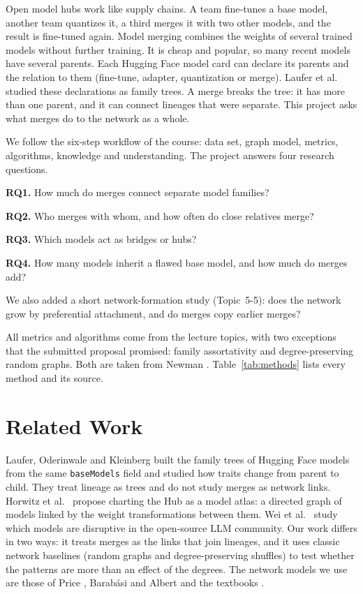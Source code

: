 \documentclass[conference]{IEEEtran}
\begin{document}
Open model hubs work like supply chains. A team fine-tunes a base model,
another team quantizes it, a third merges it with two other models, and the
result is fine-tuned again. Model merging combines the weights of several
trained models without further training. It is cheap and popular, so many
recent models have several parents. Each Hugging Face model card can declare
its parents and the relation to them (fine-tune, adapter, quantization or
merge). Laufer et al.\ \cite{laufer2025} studied these declarations as family
trees. A merge breaks the tree: it has more than one parent, and it can connect
lineages that were separate. This project asks what merges do to the network
as a whole.

We follow the six-step workflow of the course: data set, graph model, metrics,
algorithms, knowledge and understanding. The project answers four research
questions.

\textbf{RQ1.} How much do merges connect separate model families?

\textbf{RQ2.} Who merges with whom, and how often do close relatives merge?

\textbf{RQ3.} Which models act as bridges or hubs?

\textbf{RQ4.} How many models inherit a flawed base model, and how much do
merges add?

We also added a short network-formation study (Topic~5-5): does the network
grow by preferential attachment, and do merges copy earlier merges?

All metrics and algorithms come from the lecture topics, with two exceptions
that the submitted proposal promised: family assortativity and
degree-preserving random graphs. Both are taken from Newman \cite{newman2010}.
Table~\ref{tab:methods} lists every method and its source.

\section{Related Work}

Laufer, Oderinwale and Kleinberg \cite{laufer2025} built the family trees of
Hugging Face models from the same \texttt{baseModels} field and studied how
traits change from parent to child. They treat lineage as trees and do not
study merges as network links. Horwitz et al.\ \cite{horwitz2025} propose charting
the Hub as a model atlas: a directed graph of models linked by the weight
transformations between them. Wei et al.\
\cite{wei2026} study which models are disruptive in the open-source LLM
community. Our work differs in two ways: it treats merges as the links that
join lineages, and it uses classic network baselines (random graphs and
degree-preserving shuffles) to test whether the patterns are more than an
effect of the degrees. The network models we use are those of Price
\cite{price1976}, Barab\'asi and Albert \cite{barabasi1999} and the textbooks
\cite{barabasi2016,newman2010}.
\end{document}
